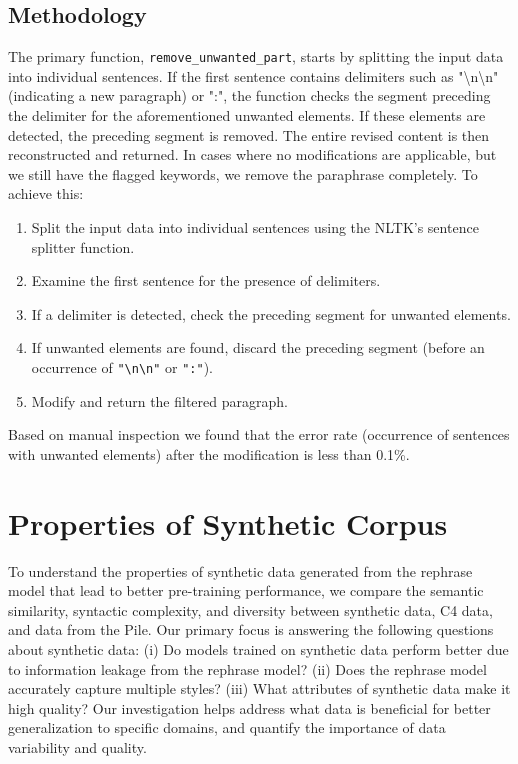 \subsection{Methodology}

The primary function, \texttt{remove\_unwanted\_part}, starts by splitting the input data into individual sentences. If the first sentence contains delimiters such as "\textbackslash n\textbackslash n" (indicating a new paragraph) or ":", the function checks the segment preceding the delimiter for the aforementioned unwanted elements. If these elements are detected, the preceding segment is removed. The entire revised content is then reconstructed and returned. In cases where no modifications are applicable, but we still have the flagged keywords, we remove the paraphrase completely. To achieve this: 

\begin{enumerate}
    \item Split the input data into individual sentences using the NLTK's sentence splitter function.
    \item Examine the first sentence for the presence of delimiters.
    \item If a delimiter is detected, check the preceding segment for unwanted elements.
    \item If unwanted elements are found, discard the preceding segment (before an occurrence of \texttt{"\textbackslash n\textbackslash n"} or \texttt{":"}).
    \item Modify and return the filtered paragraph.
\end{enumerate}

Based on manual inspection we found that the error rate (occurrence of sentences with unwanted elements) after the modification is less than 0.1\%. 







\section{Properties of Synthetic Corpus}
\label{sec:synth_properties}
To understand the properties of synthetic data generated from the rephrase model that lead to better pre-training performance, we compare the semantic similarity, syntactic complexity, and diversity between synthetic data, C4 data, and data from the Pile.  Our primary focus is answering the following questions about synthetic data: (i) Do models trained on synthetic data perform better due to information leakage from the rephrase model? (ii) Does the rephrase model accurately capture multiple styles? (iii) What attributes of synthetic data make it high quality? Our investigation helps address what data is beneficial for better generalization to specific domains, and quantify the importance of data variability and quality.

